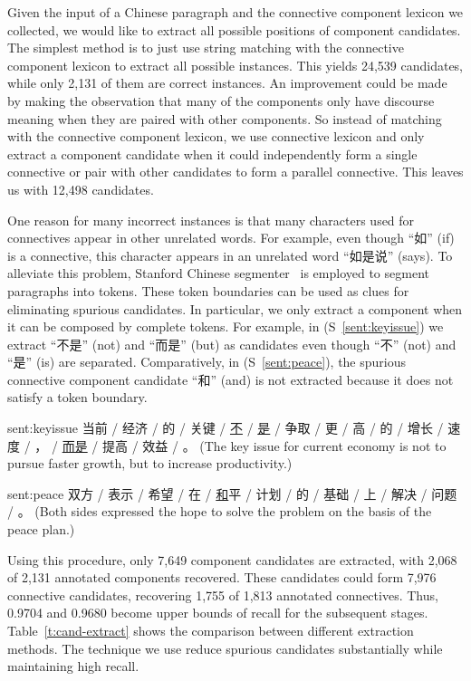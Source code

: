 Given the input of a Chinese paragraph and the connective component lexicon we collected,
we would like to extract all possible positions of component candidates.
The simplest method is to just use string matching with the connective
component lexicon to extract all possible instances. This yields
24,539 candidates, while only 2,131 of them are correct instances. An improvement
could be made by making the observation that many of the components only have
discourse meaning when they are paired with other components. So instead of matching
with the connective component lexicon, we use connective lexicon and only extract
a component candidate when it could independently form a single connective or pair
with other candidates to form a parallel connective.
This leaves us with 12,498 candidates.

One reason for many incorrect instances is that many characters used for connectives
appear in other unrelated words. For example, even though ``如'' (if) is a connective,
this character appears in an unrelated word ``如是说'' (says). To alleviate this problem,
Stanford Chinese segmenter~\citep{chang2008optimizing} is employed to segment paragraphs
into tokens. These token boundaries can be used as clues for eliminating spurious candidates.
In particular, we only extract a component when it can be composed by complete tokens.
For example, in (S~\ref{sent:keyissue}) we extract ``不是'' (not) and ``而是'' (but) as candidates
even though ``不'' (not) and ``是'' (is) are separated. Comparatively, in (S~\ref{sent:peace}),
the spurious connective component candidate ``和'' (and) is not extracted because it does
not satisfy a token boundary.

\begin{sent}{sent:keyissue}{}
    当前 / 经济 / 的 / 关键 / \underline{不} / \underline{是} / 争取 / 更 /
    高 / 的 / 增长 / 速度 / ， / \underline{而是} / 提高 / 效益 / 。
    (The key issue for current economy is not to pursue faster growth, but to
    increase productivity.)
\end{sent}

\begin{sent}{sent:peace}{}
    双方 / 表示 / 希望 / 在 / \underline{和}平 / 计划 / 的 / 基础 / 上 / 解决 / 问题 / 。
    (Both sides expressed the hope to solve the problem on the basis of the peace plan.)
\end{sent}

Using this procedure, only 7,649 component candidates are extracted, with 2,068 of 2,131 annotated
components recovered. These candidates could form 7,976 connective candidates, recovering
1,755 of 1,813 annotated connectives. Thus, 0.9704 and 0.9680 become upper bounds of recall
for the subsequent stages. Table~\ref{t:cand-extract} shows the comparison between different
extraction methods. The technique we use reduce spurious candidates substantially while
maintaining high recall.

